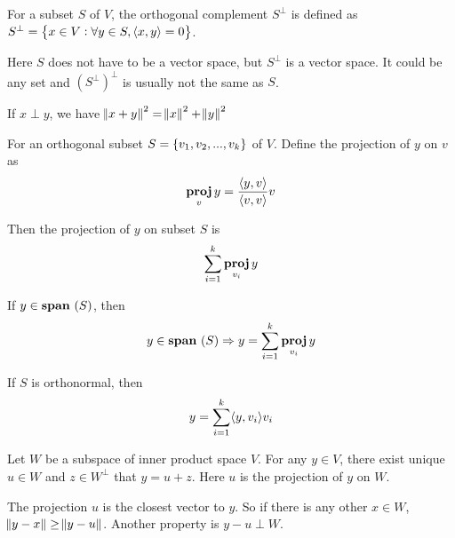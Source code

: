 \begin{definition}
    For a subset $S$ of $V$, the orthogonal complement $S^\perp$ is defined as $S^\perp=\set{x \in V: \forall y \in S, \innerproduct{x}{y} = 0}$.
\end{definition}

Here $S$ does not have to be a vector space, but $S^\perp$ is a vector space. It could be any set and $(S^\perp)^\perp$ is usually not the same as $S$. 



\begin{theorem}
    If $x \perp y$, we have $\norm{x+y}^2 = \norm{x}^2 + \norm{y}^2$    
\end{theorem}

\begin{theorem}
    For an orthogonal subset $S=\set{v_1, v_2, ..., v_k}$ of $V$. Define the projection of $y$ on $v$ as
    \begin{equation}
        \projection{y}{v} = \frac{\innerproduct{y}{v}}{\innerproduct{v}{v}} v
    \end{equation}
    
    Then the projection of $y$ on subset $S$ is
    \begin{equation}
        \sum_{i=1}^{k} \projection{y}{v_i}
    \end{equation}
    
    If $y \in \spanset{S}$, then
    \begin{equation}
        y \in \spanset{S} \Rightarrow y = \sum_{i=1}^{k} \projection{y}{v_i}
    \end{equation}
    
    If $S$ is orthonormal, then
    \begin{equation}
        y = \sum_{i=1}^k \innerproduct{y}{v_i} v_i
    \end{equation}
\end{theorem}




\begin{theorem}
Let $W$ be a subspace of inner product space $V$. For any $y \in V$, there exist unique $u \in W$ and $z \in W^\perp$ that $y = u + z$. Here $u$ is the projection of $y$ on $W$.    
\end{theorem}

\begin{theorem}
    The projection $u$ is the closest vector to $y$. So if there is any other $x \in W$, $\norm{y - x} \geq \norm{y - u}$. Another property is $y - u \perp W$.
\end{theorem}


